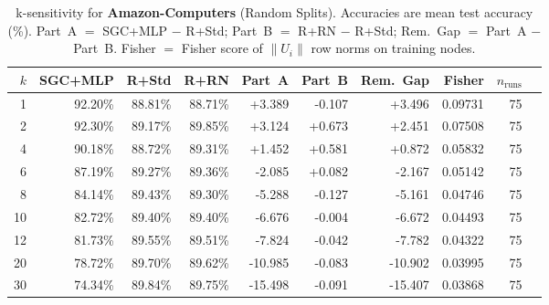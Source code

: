 \begin{table}[t]
\centering\small\setlength{\tabcolsep}{5pt}
\caption{k-sensitivity for \textbf{Amazon-Computers} (Random Splits). Accuracies are mean test accuracy (\%). Part~A $=$ SGC+MLP $-$ R+Std; Part~B $=$ R+RN $-$ R+Std; Rem.~Gap $=$ Part~A $-$ Part~B. Fisher $=$ Fisher score of $\|U_i\|$ row norms on training nodes.}
\label{tab:exp8_per_dataset_amazon-computers_random}
\begin{tabular}{rrrrrrrrrr}
\toprule
$k$ & SGC+MLP & R+Std & R+RN & Part~A & Part~B & Rem.~Gap & Fisher & $n_{\mathrm{runs}}$ \\
\midrule
1 & 92.20\% & 88.81\% & 88.71\% & +3.389 & -0.107 & +3.496 & 0.09731 & 75 \\
2 & 92.30\% & 89.17\% & 89.85\% & +3.124 & +0.673 & +2.451 & 0.07508 & 75 \\
4 & 90.18\% & 88.72\% & 89.31\% & +1.452 & +0.581 & +0.872 & 0.05832 & 75 \\
6 & 87.19\% & 89.27\% & 89.36\% & -2.085 & +0.082 & -2.167 & 0.05142 & 75 \\
8 & 84.14\% & 89.43\% & 89.30\% & -5.288 & -0.127 & -5.161 & 0.04746 & 75 \\
10 & 82.72\% & 89.40\% & 89.40\% & -6.676 & -0.004 & -6.672 & 0.04493 & 75 \\
12 & 81.73\% & 89.55\% & 89.51\% & -7.824 & -0.042 & -7.782 & 0.04322 & 75 \\
20 & 78.72\% & 89.70\% & 89.62\% & -10.985 & -0.083 & -10.902 & 0.03995 & 75 \\
30 & 74.34\% & 89.84\% & 89.75\% & -15.498 & -0.091 & -15.407 & 0.03868 & 75 \\
\bottomrule
\end{tabular}
\end{table}
